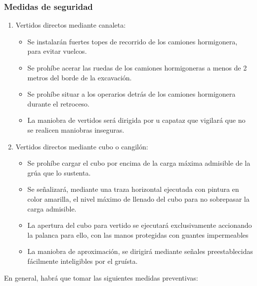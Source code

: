 \subsubsection{Medidas de seguridad}
\label{subsubsec:sysCimentacion-MS}
\begin{enumerate}[label=\alph*)]
    \item Vertidos directos mediante canaleta:
    \begin{itemize}
        \item Se instalarán fuertes topes de recorrido de los camiones hormigonera, para evitar vuelcos.
        \item Se prohíbe acerar las ruedas de los camiones hormigoneras a menos de 2 metros del borde de la excavación.
        \item Se prohíbe situar a los operarios detrás de los camiones hormigonera durante el retroceso.
        \item La maniobra de vertidos será dirigida por u capataz que vigilará que no se realicen maniobras inseguras.
    \end{itemize}
    \item Vertidos directos mediante cubo o cangilón:
    \begin{itemize}
        \item Se prohíbe cargar el cubo por encima de la carga máxima admisible de la grúa que lo sustenta.
        \item Se señalizará, mediante una traza horizontal ejecutada con pintura en color amarilla, el nivel máximo de llenado del cubo para no sobrepasar la carga admisible.
        \item La apertura del cubo para vertido se ejecutará exclusivamente accionando la palanca para ello, con las manos protegidas con guantes impermeables
        \item La maniobra de aproximación, se dirigirá mediante señales preestablecidas fácilmente inteligibles por el gruísta.
    \end{itemize}
\end{enumerate}
En general, habrá que tomar las siguientes medidas preventivas:
